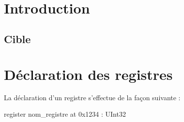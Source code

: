 

\chapter{Introduction}

\thispagestyle{empty}



\section{Cible}




\chapter{Déclaration des registres}


La déclaration d'un registre s'effectue de la façon suivante :
\begin{PLM}
register nom_registre at 0x1234 : UInt32
\end{PLM}

